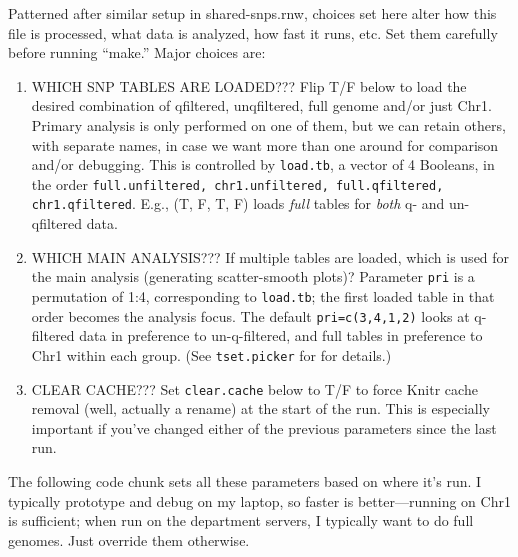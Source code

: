 \documentclass{article}\usepackage[]{graphicx}\usepackage[]{color}
\begin{document}
Patterned after similar setup in shared-snps.rnw, choices set here alter how this file is processed, 
what data is analyzed, how fast it runs, etc.  
Set them carefully before running ``make.''  Major choices are:
\begin{enumerate}

  \item WHICH SNP TABLES ARE LOADED???  Flip T/F below to load the desired combination of qfiltered, 
    unqfiltered, full genome and/or just Chr1. Primary analysis is only performed on one of them, 
    but we can retain others, with separate names, in case we want more than one around for 
    comparison and/or debugging.  This is controlled by {\tt load.tb}, a vector of 4 Booleans, 
    in the  order
      {\tt full.unfiltered, chr1.unfiltered, full.qfiltered,  chr1.qfiltered}.   
    E.g., (T, F, T, F) loads \emph{full} tables for \emph{both} q- and un-qfiltered data.
    
  \item WHICH MAIN ANALYSIS???  If multiple tables are loaded, which is used for the main analysis 
    (generating scatter-smooth plots)?  Parameter {\tt pri} is a permutation of 1:4, corresponding to 
    {\tt load.tb}; the first loaded table in that order becomes the analysis focus.  The default 
    {\tt pri=c(3,4,1,2)} looks at q-filtered data in preference to un-q-filtered, and full tables 
    in preference to Chr1 within each group.  (See {\tt tset.picker} for for details.)

  \item CLEAR CACHE???  Set {\tt clear.cache} below to T/F to force Knitr cache removal (well, 
    actually a rename) at the start of the run.  This is especially important if you've changed 
    either of the previous parameters since the last run.

\end{enumerate}
The following code chunk sets all these parameters based on where it's run.  I typically prototype 
and debug on my laptop, so faster is better---running on Chr1 is sufficient; 
when run on the department servers, I typically want to do full genomes.  Just  
override them otherwise.
\end{document}
